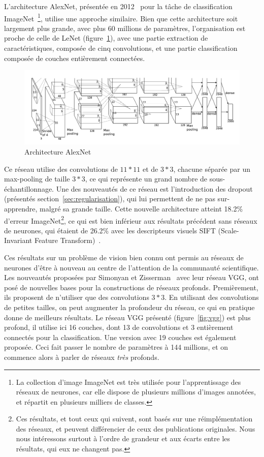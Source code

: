 L'architecture AlexNet, présentée en 2012~\cite{krizhevsky2012imagenet} pour la tâche de classification ImageNet~\cite{deng2009imagenet}\footnote{La collection d'image ImageNet est très utilisée pour l'apprentissage des réseaux de neurones, car elle dispose de plusieurs millions d'images annotées, et répartit en plusieurs milliers de classes.}, utilise une approche similaire.
Bien que cette architecture soit largement plus grande, avec plus 60 millions de paramètres, l'organisation est proche de celle de LeNet (figure~\ref{fig:alexnet}), avec une partie extraction de caractéristiques, composée de cinq convolutions, et une partie classification composée de couches entièrement connectées.

\begin{figure}%
\includegraphics[width=\columnwidth]{figures/alexnet.png}%
\caption{Architecture AlexNet~\cite{krizhevsky2012imagenet}}%
\label{fig:alexnet}%
\end{figure}

Ce réseau utilise des convolutions de $11*11$ et de $3*3$, chacune séparée par un max-pooling de taille $3*3$, ce qui représente un grand nombre de sous-échantillonnage. 
Une des nouveautés de ce réseau est l'introduction des dropout (présentés section~\ref{sec:regularisation}), qui lui permettent de ne pas sur-apprendre, malgré sa grande taille.
Cette nouvelle architecture atteint 18.2\% d'erreur ImageNet\footnote{Ces résultats, et tout ceux qui suivent, sont basés sur une réimplémentation des réseaux, et peuvent différencier de ceux des publications originales. Nous nous intéressons surtout à l'ordre de grandeur et aux écarts entre les résultats, qui eux ne changent pas.}, ce qui est bien inférieur aux résultats précédent sans réseaux de neurones, qui étaient de 26.2\% avec les descripteurs visuels SIFT (Scale-Invariant Feature Transform)~\cite{sanchez2011high}.

Ces résultats sur un problème de vision bien connu ont permis au réseaux de neurones d'être à nouveau au centre de l'attention de la communauté scientifique.
Les nouveautés proposées par Simonyan et Zisserman~\cite{simonyan2014very} avec leur réseau VGG, ont posé de nouvelles bases pour la constructions de réseaux profonds.
Premièrement, ils proposent de n'utiliser que des convolutions $3*3$.
En utilisant des convolutions de petites tailles, on peut augmenter la profondeur du réseau, ce qui en pratique donne de meilleurs résultats.
Le réseau VGG présenté (figure~\ref{fig:vgg}) est plus profond, il utilise ici 16 couches, dont 13 de convolutions et 3 entièrement connectés pour la classification.
Une version avec 19 couches est également proposée.
Ceci fait passer le nombre de paramètres à 144 millions, et on commence alors à parler de réseaux \textit{très} profonds. 


